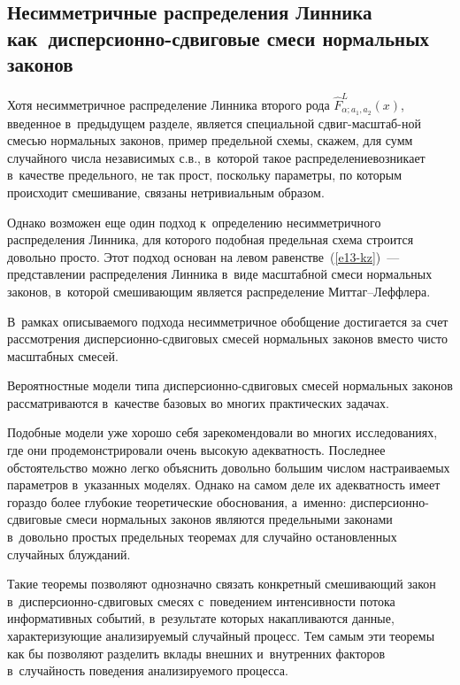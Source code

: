 \begin{multicols}{2}
\section{Несимметричные распределения Линника как~дисперсионно-сдвиговые
смеси нормальных законов}

Хотя несимметричное распределение Линника второго рода 
$\widehat F^{L}_{\alpha;a_1,a_2}(x)$, введенное в~предыдущем разделе, является
специальной сдвиг-мас\-штаб-\linebreak ной смесью нормальных законов, пример
предельной схемы, скажем, для сумм случайного числа независимых
с.в., в~которой такое распределение\linebreak возникает 
в~качестве предельного, не так прост, поскольку параметры, по которым
происходит смешивание, связаны нетривиальным образом. 
{

}

Однако
возможен еще один подход к~определению %
несимметричного распределения
Линника, для %
которого подобная предельная схема строится довольно
просто. 
%
Этот подход основан на левом равенстве~(\ref{e13-kz})~--- представлении
распределения Линника в~виде масштабной смеси нормальных %
 законов, 
в~которой смешивающим является распределение Мит\-таг--Леф\-фле\-ра. 

В~рамках
описываемого подхода несимметричное обобщение достигается за счет
рассмотрения дис\-пер\-си\-он\-но-сдви\-го\-вых смесей нормальных законов вместо
чисто масштабных смесей.

Вероятностные модели типа дис\-пер\-си\-он\-но-сдви\-го\-вых смесей нормальных
законов рассматриваются в~качестве базовых во многих практических
задачах. 

Подобные модели уже хорошо себя зарекомендовали во многих
исследованиях, где они продемонстрировали очень высокую
адекватность. Последнее обстоятельство можно легко объяснить\linebreak
довольно большим числом настраиваемых па\-ра\-мет\-ров в~указанных
моделях. Однако на самом деле их адекватность имеет гораздо более
глубокие теоретические обоснования, а~именно: дис\-пер\-си\-он\-но-сдви\-го\-вые
смеси нормальных законов являются предельными законами в~довольно
прос\-тых предельных теоремах для случайно остановленных случайных
блуж\-да\-ний. 

Такие теоремы позволяют однозначно связать конкретный
смешивающий закон в~дис\-пер\-си\-он\-но-сдви\-го\-вых смесях с~поведением
интенсивности потока информативных событий, в~результате которых
накапливаются данные, характеризующие анализируемый случайный
процесс. Тем самым эти теоремы как бы позволяют разделить вклады
внешних и~внутренних факторов в~случайность поведения анализируемого
процесса.


\end{multicols}
